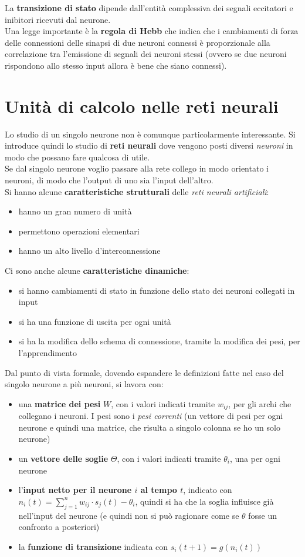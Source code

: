 La \textbf{transizione di stato} dipende dall'entità complessiva dei segnali
eccitatori e inibitori ricevuti dal neurone.\\
Una legge importante è la \textbf{regola di Hebb} che indica che i cambiamenti
di forza delle connessioni delle sinapsi di due neuroni connessi è proporzionale
alla correlazione tra l'emissione di segnali dei neuroni stessi (ovvero se due
neuroni rispondono allo stesso input allora è bene che siano connessi).
\section{Unità di calcolo nelle reti neurali}
Lo studio di un singolo neurone non è comunque particolarmente interessante. Si
introduce quindi lo studio di \textbf{reti neurali} dove vengono posti diversi
\textit{neuroni} in modo che possano fare qualcosa di utile.\\
Se dal singolo neurone voglio passare alla rete collego in modo orientato i
neuroni, di modo che l'output di uno sia l'input dell'altro. \\
Si hanno alcune \textbf{caratteristiche strutturali} delle \textit{reti neurali
artificiali}:
\begin{itemize}
	\item hanno un gran numero di unità
	\item permettono operazioni elementari
	\item hanno un alto livello d'interconnessione
\end{itemize}
Ci sono anche alcune \textbf{caratteristiche dinamiche}:
\begin{itemize}
	\item si hanno cambiamenti di stato in funzione dello stato dei neuroni
	      collegati in input
	\item si ha una funzione di uscita per ogni unità
	\item si ha la modifica dello schema di connessione, tramite la modifica dei
	      pesi, per l'apprendimento
\end{itemize}
Dal punto di vista formale, dovendo espandere le definizioni fatte nel caso del
singolo neurone a più neuroni, si lavora con:
\begin{itemize}
	\item una \textbf{matrice dei pesi} $W$, con i valori indicati tramite
	      $w_{ij}$, per gli archi che collegano i neuroni. I pesi sono i \textit{pesi
	      correnti} (un vettore di pesi per ogni neurone e quindi una matrice, che
	      risulta a singolo colonna se ho un solo neurone)
	\item un \textbf{vettore delle soglie} $\Theta$, con i valori indicati tramite
	      $\theta_i$, una per ogni neurone
	\item l'\textbf{input netto per il neurone $i$ al tempo $t$}, indicato con\\
	      $n_i(t)=\sum_{j=1}^n w_{ij}\cdot s_j(t)-\theta_i$, quindi si ha che la soglia
	      influisce già nell'input del neurone (e quindi non si può ragionare come se
	      $\theta$ fosse un confronto a posteriori)
	\item la \textbf{funzione di transizione} indicata con $s_i(t+1)=g(n_i(t))$
\end{itemize}
